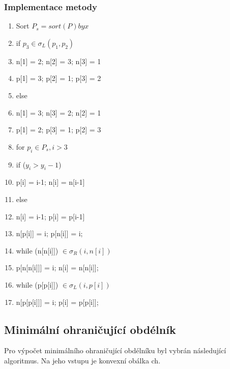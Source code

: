 \documentclass[a4paper, 12pt]{article}
\begin{document}
\subsubsection{Implementace metody}
\begin{enumerate}
	\item  Sort $P_s = sort (P) by x$
	\item if $p_3 \in \sigma_L (p_1, p_2)$
	\item \hspace {1cm} n[1] = 2; n[2] = 3; n[3] = 1
	\item \hspace {1cm} p[1] = 3; p[2] = 1; p[3] = 2
	\item else
	\item \hspace {1cm} n[1] = 3; n[3] = 2; n[2] = 1
	\item \hspace {1cm} p[1] = 2; p[3] = 1; p[2] = 3
	\item for $p_i \in P_s, i > 3$
	\item \hspace {1cm} if ($y_i>y_i-1$) 
	\item \hspace {2cm} p[i] = i-1; n[i] = n[i-1]
	\item \hspace {1cm} else 
	\item \hspace {2cm} n[i] = i-1; p[i] = p[i-1]
	\item \hspace {1cm}n[p[i]] = i; p[n[i]] = i;
	\item \hspace {1cm}while (n[n[i]]) $\in \sigma_R (i, n[i]) $
	\item \hspace {2cm} p[n[n[i]]] = i; n[i] = n[n[i]];
	\item \hspace {1cm} while (p[p[i]]) $\in \sigma_L (i, p[i]) $
	\item \hspace {2cm} n[p[p[i]]] = i; p[i] = p[p[i]];
\end{enumerate}
\clearpage

\subsection{Minimální ohraničující obdélník}
Pro výpočet minimálního ohraničující obdélníku byl vybrán následující algoritmus. Na jeho vstupu je konvexní obálka ch.
\end{document}
